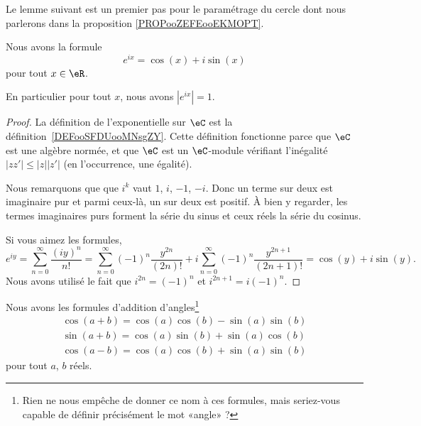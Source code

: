 Le lemme suivant est un premier pas pour le paramétrage du cercle dont nous parlerons dans la proposition \ref{PROPooZEFEooEKMOPT}.
\begin{lemma}       \label{LEMooHOYZooKQTsXW}
    Nous avons la formule
    \begin{equation}        \label{EQooRVPJooTMwNTU}
        e^{ix}=\cos(x)+i\sin(x)
    \end{equation}
    pour tout \( x\in \eR\).

    En particulier pour tout \( x\), nous avons \( |  e^{ix} |=1\).
\end{lemma}

\begin{proof}
    La définition de l'exponentielle sur \( \eC\) est la définition~\ref{DEFooSFDUooMNsgZY}. Cette définition fonctionne parce que \( \eC\) est une algèbre normée, et que \( \eC\) est un \( \eC\)-module vérifiant l'inégalité \(  | zz' |\leq | z | |z' | \) (en l'occurrence, une égalité).

    Nous remarquons que que \( i^k\) vaut \( 1\), \( i\), \( -1\), \( -i\). Donc un terme sur deux est imaginaire pur et parmi ceux-là, un sur deux est positif. À bien y regarder, les termes imaginaires purs forment la série du sinus et ceux réels la série du cosinus.

    Si vous aimez les formules,
    \begin{equation}
            e^{iy}=\sum_{n=0}^{\infty}\frac{ (iy)^n }{ n! }
            =\sum_{n=0}^{\infty}(-1)^n\frac{ y^{2n} }{ (2n)! }+i\sum_{n=0}^{\infty}(-1)^n\frac{ y^{2n+1} }{ (2n+1)! }
            =\cos(y)+i\sin(y).
    \end{equation}
    Nous avons utilisé le fait que \( i^{2n}=(-1)^n\) et \( i^{2n+1}=i(-1)^n\).
\end{proof}

\begin{lemma}       \label{LEMooJAWBooJGfZIL}
    Nous avons les formules d'addition d'angles\footnote{Rien ne nous empêche de donner ce nom à ces formules, mais seriez-vous capable de définir précisément le mot «angle» ?}
    \begin{subequations}        \label{SUBEQSooFSSMooHcYwRc}
        \begin{align}
            \cos(a+b)=\cos(a)\cos(b)-\sin(a)\sin(b) \label{EQooJYEMooQaOMib}\\
            \sin(a+b)=\cos(a)\sin(b)+\sin(a)\cos(b) \label{EQooECAUooQzckDv}\\
            \cos(a-b)=\cos(a)\cos(b)+\sin(a)\sin(b) \label{EQooCVZAooQfocya}
        \end{align}
    \end{subequations}
    pour tout \( a\), \( b\) réels.
\end{lemma}

